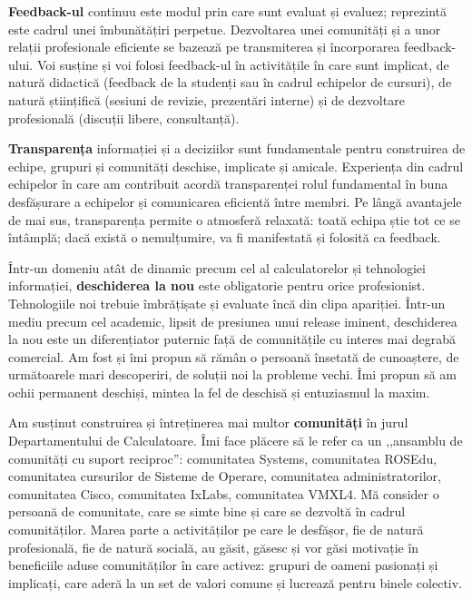\documentclass[11pt,a4paper]{article}
\begin{document}
\textbf{Feedback-ul} continuu este modul prin care sunt evaluat și evaluez;
reprezintă este cadrul unei îmbunătățiri perpetue. Dezvoltarea unei comunități
și a unor relații profesionale eficiente se bazează pe transmiterea și
încorporarea feedback-ului. Voi susține și voi folosi feedback-ul în
activitățile în care sunt implicat, de natură didactică (feedback de la
studenți sau în cadrul echipelor de cursuri), de natură științifică (sesiuni
de revizie, prezentări interne) și de dezvoltare profesională (discuții
libere, consultanță).

\textbf{Transparența} informației și a deciziilor sunt fundamentale pentru
construirea de echipe, grupuri și comunități deschise, implicate și amicale.
Experiența din cadrul echipelor în care am contribuit acordă transparenței
rolul fundamental în buna desfășurare a echipelor și comunicarea eficientă
între membri. Pe lângă avantajele de mai sus, transparența permite o atmosferă
relaxată: toată echipa știe tot ce se întâmplă; dacă există o nemulțumire, va
fi manifestată și folosită ca feedback.

Într-un domeniu atât de dinamic precum cel al calculatorelor și tehnologiei
informației, \textbf{deschiderea la nou} este obligatorie pentru orice
profesionist.  Tehnologiile noi trebuie îmbrățișate și evaluate încă din
clipa apariției.  Într-un mediu precum cel academic, lipsit de presiunea unui
release iminent, deschiderea la nou este un diferențiator puternic față de
comunitățile cu interes mai degrabă comercial. Am fost și îmi propun să rămân
o persoană însetată de cunoaștere, de următoarele mari descoperiri, de soluții
noi la probleme vechi. Îmi propun să am ochii permanent deschiși, mintea la
fel de deschisă și entuziasmul la maxim.

Am susținut construirea și întreținerea mai multor \textbf{comunități} în
jurul Departamentului de Calculatoare. Îmi face plăcere să le refer ca un
,,ansamblu de comunități cu suport reciproc'': comunitatea Systems,
comunitatea ROSEdu, comunitatea cursurilor de Sisteme de Operare, comunitatea
administratorilor, comunitatea Cisco, comunitatea IxLabs, comunitatea VMXL4.
Mă consider o persoană de comunitate, care se simte bine și care se dezvoltă
în cadrul comunităților. Marea parte a activităților pe care le desfășor, fie
de natură profesională, fie de natură socială, au găsit, găsesc și vor găsi
motivație în beneficiile aduse comunităților în care activez: grupuri de
oameni pasionați și implicați, care aderă la un set de valori comune și
lucrează pentru binele colectiv.
\end{document}
